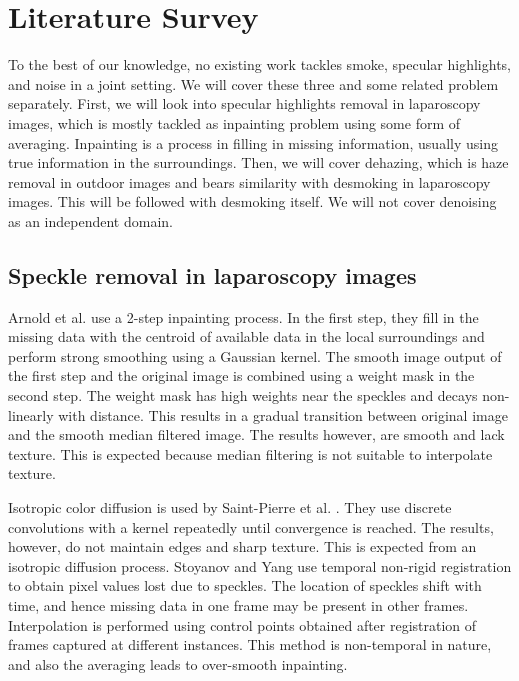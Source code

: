
\chapter{Literature Survey}

To the best of our knowledge, no existing work tackles smoke, specular highlights, and noise in a joint setting. We will cover these three and some related problem separately. First, we will look into specular highlights removal in laparoscopy images, which is mostly tackled as inpainting problem using some form of averaging. Inpainting is a process in filling in missing information, usually using true information in the surroundings. Then, we will cover dehazing, which is haze removal in outdoor images and bears similarity with desmoking in laparoscopy images. This will be followed with desmoking itself. We will not cover denoising as an independent domain.

\section{Speckle removal in laparoscopy images}
Arnold et al.\cite{arnold2010speckle} use a 2-step inpainting process. In the first step, they fill in the missing data with the centroid of available data in the local surroundings and perform strong smoothing using a Gaussian kernel. The smooth image output of the first step and the original image is combined using a weight mask in the second step. The weight mask has high weights near the speckles and decays non-linearly with distance. This results in a gradual transition between original image and the smooth median filtered image. The results however, are smooth and lack texture. This is expected because median filtering is not suitable to interpolate texture.

Isotropic color diffusion is used by Saint-Pierre et al. \cite{saint2011detection}. They use discrete convolutions with a kernel repeatedly until convergence is reached. The results, however, do not maintain edges and sharp texture. This is expected from an isotropic diffusion process. Stoyanov and Yang \cite{stoyanov2005removing} use temporal non-rigid registration to obtain pixel values lost due to speckles. The location of speckles shift with time, and hence missing data in one frame may be present in other frames. Interpolation is performed using control points obtained after registration of frames captured at different instances. This method is non-temporal in nature, and also the averaging leads to over-smooth inpainting.

